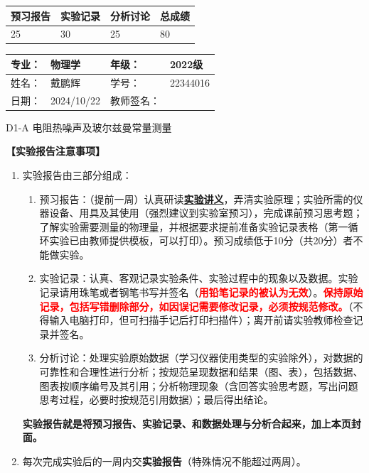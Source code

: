 \documentclass[dvipsnames, svgnames,a4paper,11pt]{article}
\begin{document}
\begin{table}
	\renewcommand\arraystretch{1.7}
	\begin{tabularx}{\textwidth}{
		|X|X|X|X
		|X|X|X|X|}
	\hline
	\multicolumn{2}{|c|}{预习报告}&\multicolumn{2}{|c|}{实验记录}&\multicolumn{2}{|c|}{分析讨论}&\multicolumn{2}{|c|}{总成绩}\\
	\hline
	\LARGE25 & & \LARGE30 & & \LARGE25 & & \LARGE80 & \\
	\hline
	\end{tabularx}
\end{table}


\begin{table}
	\renewcommand\arraystretch{1.7}
	\begin{tabularx}{\textwidth}{|X|X|X|X|}
	\hline
	专业：& 物理学 &年级：& 2022级\\
	\hline
	姓名：& 戴鹏辉  & 学号： & 22344016 \\
	\hline
	日期：& 2024/10/22 & 教师签名：& \\
	\hline
	\end{tabularx}
\end{table}

\begin{center}
	\LARGE D1-A \quad 电阻热噪声及玻尔兹曼常量测量
\end{center}

\textbf{【实验报告注意事项】}
\begin{enumerate}
	\item 实验报告由三部分组成：
	\begin{enumerate}
		\item 预习报告：（提前一周）认真研读\underline{\textbf{实验讲义}}，弄清实验原理；实验所需的仪器设备、用具及其使用（强烈建议到实验室预习），完成课前预习思考题；了解实验需要测量的物理量，并根据要求提前准备实验记录表格（第一循环实验已由教师提供模板，可以打印）。预习成绩低于10分（共20分）者不能做实验。
	    \item 实验记录：认真、客观记录实验条件、实验过程中的现象以及数据。实验记录请用珠笔或者钢笔书写并签名（\textcolor{red}{\textbf{用铅笔记录的被认为无效}}）。\textcolor{red}{\textbf{保持原始记录，包括写错删除部分，如因误记需要修改记录，必须按规范修改。}}（不得输入电脑打印，但可扫描手记后打印扫描件）；离开前请实验教师检查记录并签名。
	    \item 分析讨论：处理实验原始数据（学习仪器使用类型的实验除外），对数据的可靠性和合理性进行分析；按规范呈现数据和结果（图、表），包括数据、图表按顺序编号及其引用；分析物理现象（含回答实验思考题，写出问题思考过程，必要时按规范引用数据）；最后得出结论。
	\end{enumerate}
	\textbf{实验报告就是将预习报告、实验记录、和数据处理与分析合起来，加上本页封面。}
	\item 每次完成实验后的一周内交\textbf{实验报告}（特殊情况不能超过两周）。
\end{enumerate}
\end{document}
